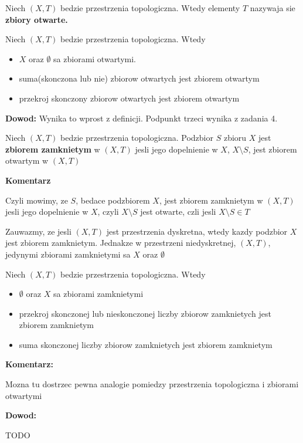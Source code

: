 \documentclass{article}
\begin{document}
\begin{tcolorbox}[colback=white!90!red,colframe=black!35!red,title=1.2.1 Definicja: Zbior otwarty- open set]

Niech $(X, T)$ bedzie przestrzenia topologiczna. Wtedy elementy $T$ nazywaja sie \textbf{zbiory otwarte.}

\end{tcolorbox}

\begin{tcolorbox}[colback=white!90!green,colframe=black!35!green,title=1.2.2 Lemat: Przestrzen topologiczna i zbiory otwarte]
Niech $(X, T)$ bedzie przestrzenia topologiczna. Wtedy

\begin{itemize}%
       
\item $X$ oraz $\emptyset$ sa zbiorami otwartymi.
\item suma(skonczona lub nie) zbiorow otwartych jest zbiorem otwartym
\item przekroj skonczony zbiorow otwartych jest zbiorem otwartym
\end{itemize}%
\end{tcolorbox}
\textbf{Dowod:}
Wynika to wprost z definicji. Podpunkt trzeci wynika z zadania 4.

\begin{tcolorbox}[colback=white!90!red,colframe=black!35!red,title=1.2.3 Definicja: Zbior zamkniety- closed set]

Niech $(X,T)$ bedzie przestrzenia topologiczna. Podzbior $S$ zbioru $X$ jest \textbf{zbiorem zamknietym} w $(X, T)$ jesli jego dopelnienie w $X$, $X\setminus S$, jest zbiorem otwartym w $(X, T)$
\end{tcolorbox}
\textbf{Komentarz}

Czyli mowimy, ze $S$, bedace podzbiorem $X$, jest zbiorem zamknietym w $(X,T)$ jesli jego dopelnienie w $X$, czyli $X\setminus S$ jest otwarte, czli jesli $X\setminus S \in T$

Zauwazmy, ze jesli $(X,T)$ jest przestrzenia dyskretna, wtedy kazdy podzbior $X$ jest zbiorem zamknietym. Jednakze w przestrzeni niedyskretnej, $(X,T)$, jedynymi zbiorami zamknietymi sa $X$ oraz $\emptyset$

\begin{tcolorbox}[colback=white!90!green,colframe=black!35!green,title=1.2.5 Lemat: Przestrzen topologiczna i zbiory zamkniete]

Niech $(X,T)$ bedzie przestrzenia topologiczna. Wtedy

\begin{itemize}%
\item $\emptyset$ oraz $X$ sa zbiorami zamknietymi
\item przekroj skonczonej lub nieskonczonej liczby zbiorow zamknietych jest zbiorem zamknietym
\item suma skonczonej liczby zbiorow zamknietych jest zbiorem zamknietym
    
\end{itemize}%
\end{tcolorbox}
\textbf{Komentarz:}

Mozna tu dostrzec pewna analogie pomiedzy przestrzenia topologiczna i zbiorami otwartymi

\textbf{Dowod:}

TODO
\end{document}
